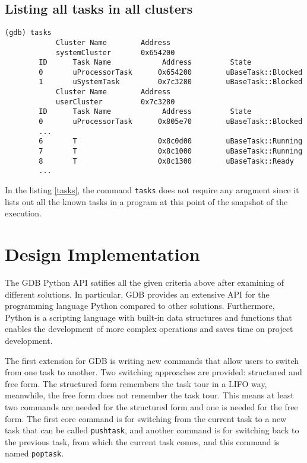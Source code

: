 \subsection{Listing all tasks in all clusters}
\begin{lstlisting}[caption={\text{tasks} command}, label={tasks}]
(gdb) tasks
            Cluster Name        Address
            systemCluster       0x654200
        ID      Task Name            Address         State
        0       uProcessorTask      0x654200        uBaseTask::Blocked
        1       uSystemTask         0x7c3280        uBaseTask::Blocked
            Cluster Name        Address
            userCluster         0x7c3280
        ID      Task Name            Address         State
        0       uProcessorTask      0x805e70        uBaseTask::Blocked
        ...
        6       T                   0x8c0d00        uBaseTask::Running
        7       T                   0x8c1000        uBaseTask::Running
        8       T                   0x8c1300        uBaseTask::Ready
        ...
\end{lstlisting}
In the listing \ref{tasks}, the command \verb|tasks| does not require any
arugment since it lists out all the known tasks in a \uCPPS program at this
point of the snapshot of the execution.

\section{Design Implementation}
The GDB Python API satifies all the given criteria above after examining of different solutions. In particular, GDB provides an extensive API for
the programming language Python compared to other solutions. Furthermore, Python is a scripting language with built-in
data structures and functions that enables the development of more complex
operations and saves time on project development.

The first extension for GDB is writing new commands that allow
users to switch from one \uCCS task to another. Two switching approaches are
provided: structured and free form. The structured form remembers the task tour in a
LIFO way, meanwhile, the free form does not remember the task tour. This means
at least two commands are needed for the structured form and one is needed for
the free form. The first core command is for switching from the current task to
a new task that can be called \verb|pushtask|, and another command
is for switching back to the previous task, from which the current task comes, and this command is named \verb|poptask|.

